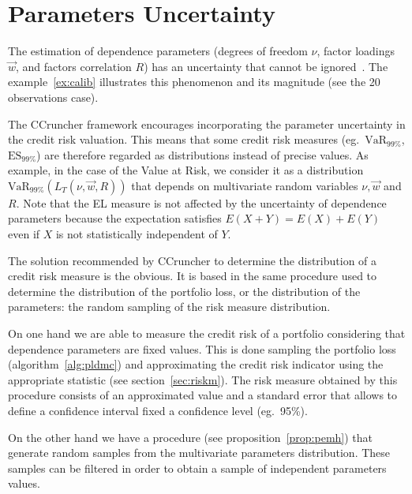 \documentclass[11pt,fleqn]{book} %
\begin{document}
\section{Parameters Uncertainty}

The estimation of dependence parameters (degrees of freedom $\nu$, factor
loadings $\vec{w}$, and factors correlation $R$) has an uncertainty that 
cannot be ignored~\cite{tarashev:2010,gossl:2005}. The example~\ref{ex:calib} 
illustrates this phenomenon and its magnitude (see the 20 observations case).

The CCruncher framework encourages incorporating the parameter uncertainty 
in the credit risk valuation. This means that some credit risk measures
(eg.\ $\text{VaR}_{99\%}$, $\text{ES}_{99\%}$) are therefore regarded as 
distributions instead of precise values. As example, in the case of the Value 
at Risk, we consider it as a distribution $\text{VaR}_{99\%}(L_T(\nu,\vec{w},R))$ 
that depends on multivariate random variables $\nu, \vec{w}$ and $R$.
Note that the EL measure is not affected by the uncertainty of dependence 
parameters because the expectation satisfies $E(X+Y)=E(X)+E(Y)$ even if $X$ 
is not statistically independent of $Y$.

The solution recommended by CCruncher to determine the distribution of a
credit risk measure is the obvious. It is based in the same procedure 
used to determine the distribution of the portfolio loss, or the distribution 
of the parameters: the random sampling of the risk measure distribution. 

On one hand we are able to measure the credit risk of a portfolio considering
that dependence parameters are fixed values. This is done sampling the 
portfolio loss (algorithm~\ref{alg:pldmc}) and approximating the credit risk 
indicator using the appropriate statistic (see section~\ref{sec:riskm}). The 
risk measure obtained by this procedure consists of an approximated value and
a standard error that allows to define a confidence interval fixed a 
confidence level (eg.\ 95\%).

On the other hand we have a procedure (see proposition~\ref{prop:pemh}) that 
generate random samples from the multivariate parameters distribution.
These samples can be filtered in order to obtain a sample of independent
parameters values.
\end{document}
